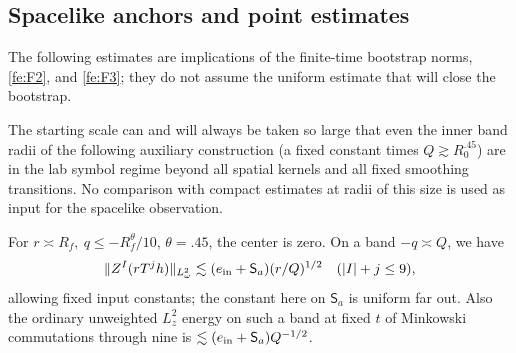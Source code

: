 \subsection{Spacelike anchors and point estimates}\label{fe:anchors}

The following estimates are implications of the finite-time bootstrap norms, \eqref{fe:F2}, and \eqref{fe:F3}; they do not assume the uniform estimate that will close the bootstrap.

The starting scale can and will always be taken so large that even the inner band radii of the following auxiliary construction (a fixed constant times \(Q\gtrsim R_0^{.45}\)) are in the lab symbol regime beyond all spatial kernels and all fixed smoothing transitions. No comparison with compact estimates at radii of this size is used as input for the spacelike observation.

\begin{lemma}\label{fe:spacelike-anchors}
For \(r\asymp R_f,\ q\le-R_f^\theta/10\), \(\theta=.45\), the center is zero. On a band \(-q\asymp Q\), we have
\begin{equation}\label{fe:F6}
\|Z^I(rT^j h)\|_{L^2_\omega}\lesssim (e_{\rm in}+\mathsf S_a)(r/Q)^{1/2}
               \quad (|I|+j\le9),
\end{equation}
allowing fixed input constants; the constant here on \(\mathsf S_a\) is uniform far out. Also the ordinary unweighted \(L^2_z\) energy on such a band at fixed \(t\) of Minkowski commutations through nine is \(\lesssim (e_{\rm in}+\mathsf S_a)Q^{-1/2}\).
\end{lemma}

